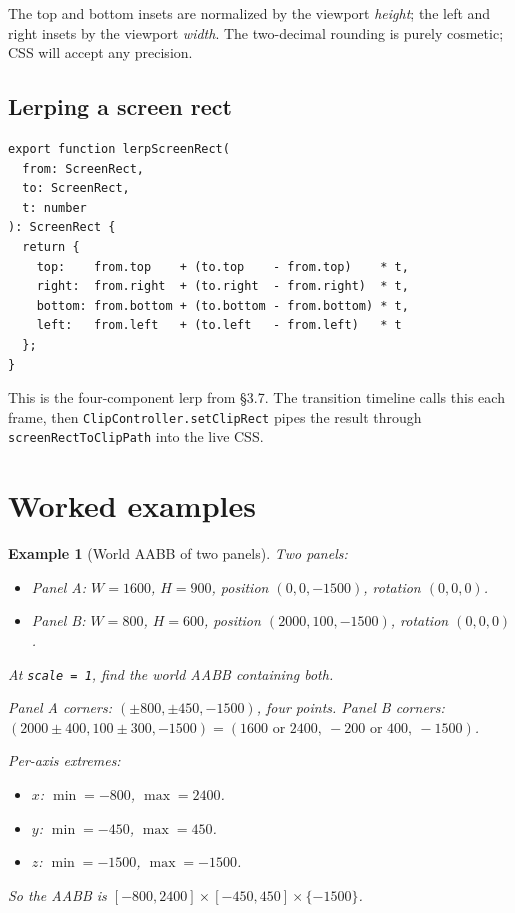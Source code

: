 \documentclass{article}
\newtheorem{example}{Example}
\begin{document}
The top and bottom insets are normalized by the viewport \emph{height}; the left and
right insets by the viewport \emph{width}. The two-decimal rounding is purely cosmetic;
CSS will accept any precision.

\subsection{Lerping a screen rect}

\begin{lstlisting}
export function lerpScreenRect(
  from: ScreenRect,
  to: ScreenRect,
  t: number
): ScreenRect {
  return {
    top:    from.top    + (to.top    - from.top)    * t,
    right:  from.right  + (to.right  - from.right)  * t,
    bottom: from.bottom + (to.bottom - from.bottom) * t,
    left:   from.left   + (to.left   - from.left)   * t
  };
}
\end{lstlisting}

This is the four-component lerp from \S 3.7. The transition timeline calls this each
frame, then \texttt{ClipController.setClipRect} pipes the result through
\texttt{screenRectToClipPath} into the live CSS.

\section{Worked examples}

\begin{example}[World AABB of two panels]
Two panels:
\begin{itemize}
  \item Panel A: $W = 1600$, $H = 900$, position $(0, 0, -1500)$, rotation $(0, 0, 0)$.
  \item Panel B: $W = 800$, $H = 600$, position $(2000, 100, -1500)$, rotation $(0, 0, 0)$.
\end{itemize}
At \texttt{scale = 1}, find the world AABB containing both.

Panel A corners: $(\pm 800, \pm 450, -1500)$, four points.
Panel B corners: $(2000 \pm 400, 100 \pm 300, -1500) = (1600\text{ or }2400,\ -200\text{ or }400,\ -1500)$.

Per-axis extremes:
\begin{itemize}
  \item $x$: $\min = -800$, $\max = 2400$.
  \item $y$: $\min = -450$, $\max = 450$.
  \item $z$: $\min = -1500$, $\max = -1500$.
\end{itemize}
So the AABB is $[-800, 2400] \times [-450, 450] \times \{-1500\}$.
\end{example}
\end{document}
